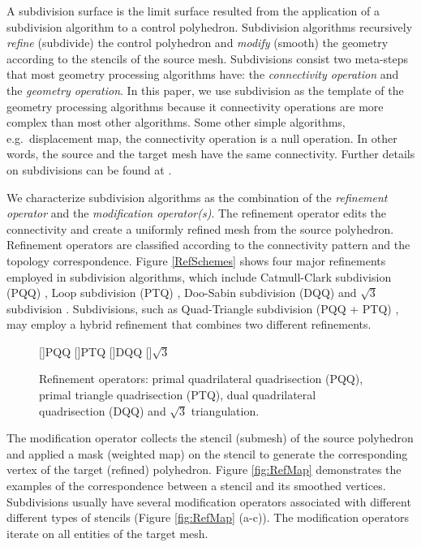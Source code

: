 A subdivision surface is the limit surface resulted from the
application of a subdivision algorithm to a control polyhedron.
Subdivision algorithms recursively \emph{refine} (subdivide) 
the control polyhedron and \emph{modify} (smooth) the geometry
according to the stencils of the source mesh.
Subdivisions consist two meta-steps that most geometry processing
algorithms have: the \emph{connectivity operation} and the 
\emph{geometry operation}. In this paper, we use subdivision
as the template of the geometry processing algorithms because
it connectivity operations are more complex than most other
algorithms. Some other simple algorithms, e.g.\ displacement map,
the connectivity operation is a null operation. In other words,
the source and the target mesh have the same connectivity.
Further details on subdivisions can be found at 
\cite{siggraph1998notes}.

We characterize subdivision algorithms as the combination 
of the \emph{refinement operator} and the 
\emph{modification operator(s)}. 
The refinement operator edits the connectivity
and create a uniformly refined mesh from the source polyhedron.
Refinement operators are classified according to the connectivity
pattern and the topology correspondence. 
Figure \ref{RefSchemes} shows four major refinements employed
in subdivision algorithms, which include 
Catmull-Clark subdivision (PQQ) \cite{cc},
Loop subdivision (PTQ) \cite{loop}, 
Doo-Sabin subdivision (DQQ) \cite{ds}
and $\sqrt{3}$ subdivision \cite{sqrt3}.
Subdivisions, such as Quad-Triangle subdivision (PQQ + PTQ) \cite{sqt},
may employ a hybrid refinement that combines two different refinements.

\begin{figure}
  \centering
  []{\scriptsize PQQ} 
  []{\scriptsize PTQ}
  []{\scriptsize DQQ} 
  []{\scriptsize $\sqrt{3}$} 
  \caption{Refinement operators: 
    primal quadrilateral quadrisection (PQQ),
    primal triangle quadrisection (PTQ),
    dual quadrilateral quadrisection (DQQ) and
    $\sqrt{3}$ triangulation.}
  \label{fig:RefSchemes}
\end{figure}

The modification operator collects the stencil (submesh) of 
the source polyhedron and applied a mask (weighted map) 
on the stencil to generate the corresponding vertex of 
the target (refined) polyhedron. Figure \ref{fig:RefMap} 
demonstrates the examples of the correspondence 
between a stencil and its smoothed vertices. Subdivisions
usually have several modification operators associated with different
different types of stencils (Figure \ref{fig:RefMap} (a-c)). 
The modification operators iterate on all entities of the target
mesh.

